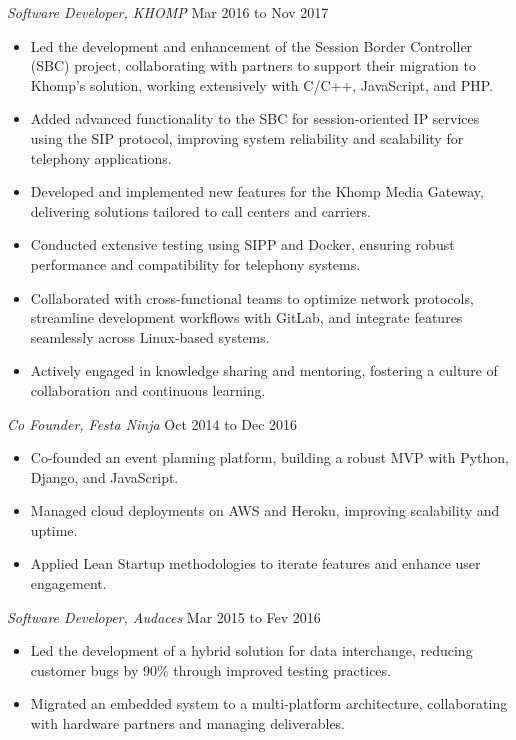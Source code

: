 \documentclass[line,margin]{res}
\begin{document}
\begin{resume}
                {\sl Software Developer, KHOMP} \hfill Mar 2016 to Nov 2017 \\
                 \begin{itemize}  \itemsep -2pt
                 \item Led the development and enhancement of the Session Border Controller (SBC) project, collaborating with partners to support their migration to Khomp's solution, working extensively with C/C++, JavaScript, and PHP.
                 \item Added advanced functionality to the SBC for session-oriented IP services using the SIP protocol, improving system reliability and scalability for telephony applications.
                 \item Developed and implemented new features for the Khomp Media Gateway, delivering solutions tailored to call centers and carriers.
                 \item Conducted extensive testing using SIPP and Docker, ensuring robust performance and compatibility for telephony systems.
                 \item Collaborated with cross-functional teams to optimize network protocols, streamline development workflows with GitLab, and integrate features seamlessly across Linux-based systems.
                 \item Actively engaged in knowledge sharing and mentoring, fostering a culture of collaboration and continuous learning.
                \end{itemize}

                {\sl Co Founder, Festa Ninja} \hfill Oct 2014 to Dec 2016 \\
                 \begin{itemize}  \itemsep -2pt
                 \item Co-founded an event planning platform, building a robust MVP with Python, Django, and JavaScript.               
                 \item Managed cloud deployments on AWS and Heroku, improving scalability and uptime.
                 \item Applied Lean Startup methodologies to iterate features and enhance user engagement.

\end{itemize}

                {\sl Software Developer, Audaces} \hfill Mar 2015 to Fev 2016 \\
                  \begin{itemize}
                    \item Led the development of a hybrid solution for data interchange, reducing customer bugs by 90\% through improved testing practices.
                    \item Migrated an embedded system to a multi-platform architecture, collaborating with hardware partners and managing deliverables.
                   \end{itemize}


\end{resume}
\end{document}
